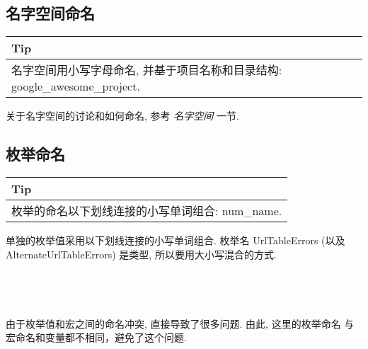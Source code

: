 \documentclass[a4paper,11pt,CJK]{article}
\begin{document}
\begin{CJK}{UTF8}{gbsn}
\subsection{名字空间命名}
\begin{table}[htbp]
\flushleft
\begin{tabular}{p{400pt}}
\toprule
\rowcolor[gray]{.8} Tip \\
\midrule
名字空间用小写字母命名, 并基于项目名称和目录结构: google\_awesome\_project.
\\
\bottomrule
\end{tabular}
\end{table}
关于名字空间的讨论和如何命名, 参考 \emph{名字空间} 一节.

\subsection{枚举命名}
\begin{table}[htbp]
\flushleft
\begin{tabular}{p{400pt}}
\toprule
\rowcolor[gray]{.8} Tip \\
\midrule
枚举的命名以下划线连接的小写单词组合: num\_name.
\\
\bottomrule
\end{tabular}
\end{table}
单独的枚举值采用以下划线连接的小写单词组合. 枚举名 UrlTableErrors (以及 AlternateUrlTableErrors) 是类型, 所以要用大小写混合的方式.\\
\\
\\
\\
\\
\indent 由于枚举值和宏之间的命名冲突, 直接导致了很多问题. 由此, 这里的枚举命名
与宏命名和变量都不相同，避免了这个问题.\\


\end{CJK}
\end{document}

